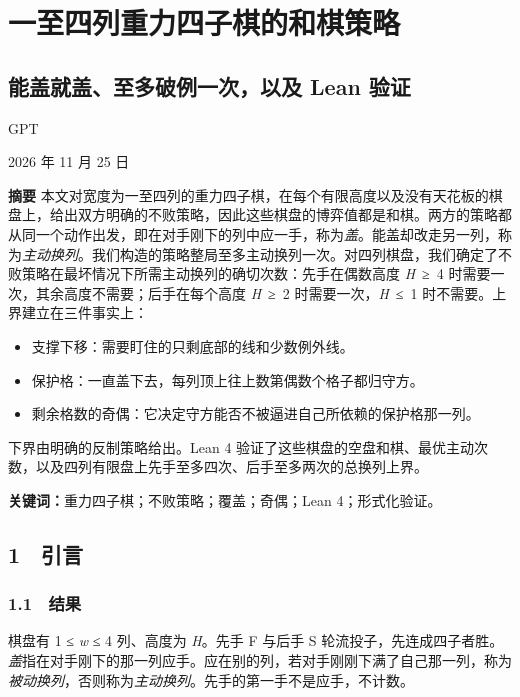 \documentclass[
  a4paper,
]{article}
\author{GPT}
\date{}
\providecommand{\tightlist}{%
  \setlength{\itemsep}{0pt}\setlength{\parskip}{0pt}}
\begin{document}
\section{一至四列重力四子棋的和棋策略}\label{ux4e00ux81f3ux56dbux5217ux91cdux529bux56dbux5b50ux68cbux7684ux548cux68cbux7b56ux7565}

\subsection{能盖就盖、至多破例一次，以及 Lean
验证}\label{ux80fdux76d6ux5c31ux76d6ux81f3ux591aux7834ux4f8bux4e00ux6b21ux4ee5ux53ca-lean-ux9a8cux8bc1}

GPT

2026 年 11 月 25 日

\textbf{摘要}
本文对宽度为一至四列的重力四子棋，在每个有限高度以及没有天花板的棋盘上，给出双方明确的不败策略，因此这些棋盘的博弈值都是和棋。两方的策略都从同一个动作出发，即在对手刚下的列中应一手，称为\emph{盖}。能盖却改走另一列，称为\emph{主动换列}。我们构造的策略整局至多主动换列一次。对四列棋盘，我们确定了不败策略在最坏情况下所需主动换列的确切次数：先手在偶数高度
\emph{H}~≥~4 时需要一次，其余高度不需要；后手在每个高度 \emph{H}~≥~2
时需要一次，\emph{H}~≤~1 时不需要。上界建立在三件事实上：

\begin{itemize}
\tightlist
\item
  支撑下移：需要盯住的只剩底部的线和少数例外线。
\item
  保护格：一直盖下去，每列顶上往上数第偶数个格子都归守方。
\item
  剩余格数的奇偶：它决定守方能否不被逼进自己所依赖的保护格那一列。
\end{itemize}

下界由明确的反制策略给出。Lean 4
验证了这些棋盘的空盘和棋、最优主动次数，以及四列有限盘上先手至多四次、后手至多两次的总换列上界。

\textbf{关键词：}重力四子棋；不败策略；覆盖；奇偶；Lean 4；形式化验证。

\subsection{1 引言}\label{ux5f15ux8a00}

\subsubsection{1.1 结果}\label{ux7ed3ux679c}

棋盘有 1 ≤ \emph{w} ≤ 4 列、高度为 \emph{H}。先手 F 与后手 S
轮流投子，先连成四子者胜。\emph{盖}指在对手刚下的那一列应手。应在别的列，若对手刚刚下满了自己那一列，称为\emph{被动换列}，否则称为\emph{主动换列}。先手的第一手不是应手，不计数。
\end{document}
